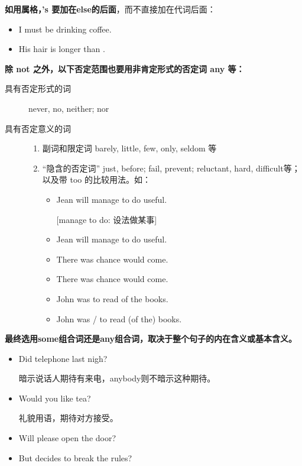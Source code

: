\textbf{如用属格，'s 要加在else的后面}，而不直接加在代词后面：
\begin{itemize}
\item I must be drinking  coffee.
\item His hair is longer than .
\end{itemize}

\textbf{除 not 之外，以下否定范围也要用非肯定形式的否定词 any 等：}
\begin{description}
\item[具有否定形式的词] never, no, neither; nor
\item[具有否定意义的词]

  \begin{enumerate}
  \item 副词和限定词 barely, little, few, only, seldom 等
  \item “隐含的否定词” just, before; fail, prevent; reluctant, hard,
    difficult等；以及带 too 的比较用法。如：
    \begin{itemize}
    \item Jean will  manage to do  useful.

      [manage to do: 设法做某事]
    \item Jean will  manage to do  useful.
    \item There was  chance  would come.
    \item There was  chance  would come.
    \item John was  to read  of the books.
    \item John was / to read  (of the) books.
    \end{itemize}
  \end{enumerate}
\end{description}

\textbf{最终选用some组合词还是any组合词，取决于整个句子的内在含义或基本含义。}
\begin{itemize}
\item Did  telephone last nigh?

  暗示说话人期待有来电，anybody则不暗示这种期待。

\item Would you like  tea?

  礼貌用语，期待对方接受。

\item Will  please open the door?

\item But   decides to break the
  rules?
\end{itemize}

